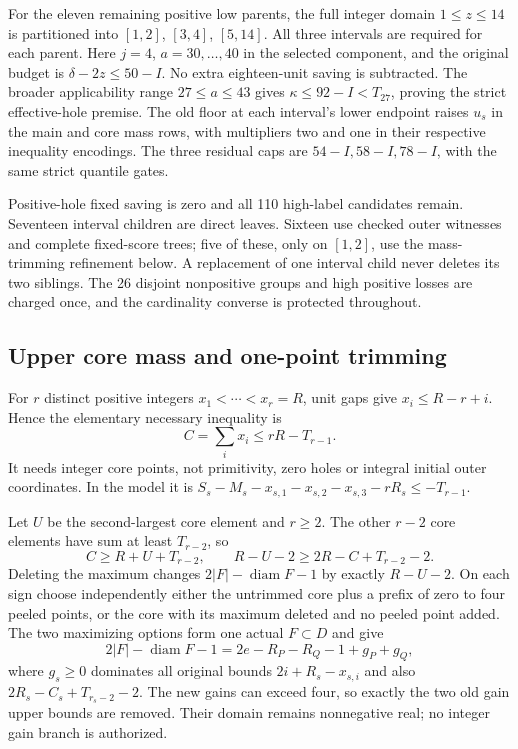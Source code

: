 \documentclass[11pt,a4paper]{article}
\theoremstyle{remark}
\begin{document}
For the eleven remaining positive low parents, the full integer domain
$1\le z\le14$ is partitioned into $[1,2]$, $[3,4]$, $[5,14]$.
All three intervals are required for each parent. Here $j=4$,
$a=30,\ldots,40$ in the selected component, and the original budget is
$\delta-2z\le50-I$. No extra eighteen-unit saving is subtracted.
The broader applicability range $27\le a\le43$ gives
$\kappa\le92-I<T_{27}$, proving the strict effective-hole premise.
The old floor at each interval's lower endpoint raises $u_s$ in the
main and core mass rows, with multipliers two and one in their
respective inequality encodings. The three residual caps are
$54-I,58-I,78-I$, with the same strict quantile gates.

Positive-hole fixed saving is zero and all 110 high-label candidates
remain. Seventeen interval children are direct leaves. Sixteen use
checked outer witnesses and complete fixed-score trees; five of these,
only on $[1,2]$, use the mass-trimming refinement below. A replacement
of one interval child never deletes its two siblings. The 26 disjoint
nonpositive groups and high positive losses are charged once, and the
cardinality converse is protected throughout.

\subsection{Upper core mass and one-point trimming}
For $r$ distinct positive integers $x_1<\cdots<x_r=R$, unit gaps give
$x_i\le R-r+i$. Hence the elementary necessary inequality is
\begin{equation}\label{u86:eq:87uppermass}
 C=\sum_i x_i\le rR-T_{r-1}.
\end{equation}
It needs integer core points, not primitivity, zero holes or integral
initial outer coordinates. In the model it is
$S_s-M_s-x_{s,1}-x_{s,2}-x_{s,3}-rR_s\le-T_{r-1}$.

Let $U$ be the second-largest core element and $r\ge2$. The other
$r-2$ core elements have sum at least $T_{r-2}$, so
\[
 C\ge R+U+T_{r-2},\qquad
 R-U-2\ge2R-C+T_{r-2}-2.
\]
Deleting the maximum changes $2|F|-\operatorname{diam}F-1$ by exactly
$R-U-2$. On each sign choose independently either the untrimmed core
plus a prefix of zero to four peeled points, or the core with its
maximum deleted and no peeled point added. The two maximizing options
form one actual $F\subset D$ and give
\[
 2|F|-\operatorname{diam}F-1
 =2e-R_P-R_Q-1+g_P+g_Q,
\]
where $g_s\ge0$ dominates all original bounds $2i+R_s-x_{s,i}$ and
also $2R_s-C_s+T_{r_s-2}-2$. The new gains can exceed four, so exactly
the two old gain upper bounds are removed. Their domain remains
nonnegative real; no integer gain branch is authorized.
\end{document}
